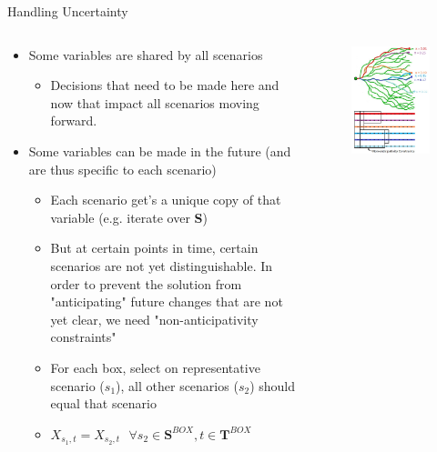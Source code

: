 \documentclass[10pt, aspectratio=169]{beamer}
\begin{document}
\begin{frame}{Handling Uncertainty}
    \begin{columns}
        \begin{column}{0.5\textwidth}
            \begin{itemize}
                \item Some variables are shared by all scenarios
                \begin{itemize}
                    \item Decisions that need to be made here and now that impact all scenarios moving forward.
                \end{itemize}
                \item Some variables can be made in the future (and are thus specific to each scenario)
                \begin{itemize}
                    \item Each scenario get's a unique copy of that variable (e.g. iterate over \textbf{S})
                    \item But at certain points in time, certain scenarios are not yet distinguishable. In order to prevent the solution from "anticipating" future changes that are not yet clear, we need "non-anticipativity constraints"
                    \item For each box, select on representative scenario ($s_1$), all other scenarios ($s_2$) should equal that scenario 
                    \item $X_{s_1,t} = X_{s_2,t} \ \ \ \forall s_2 \in \textbf{S}^{BOX}, t \in \textbf{T}^{BOX}$
                \end{itemize}
            \end{itemize}
        \end{column}
        \begin{column}{0.5\textwidth}
            \begin{figure}
                \includegraphics[width=0.75\linewidth]{StochasticTreeHighlight.jpg}

\end{figure}
\end{column}
\end{columns}
\end{frame}
\end{document}
